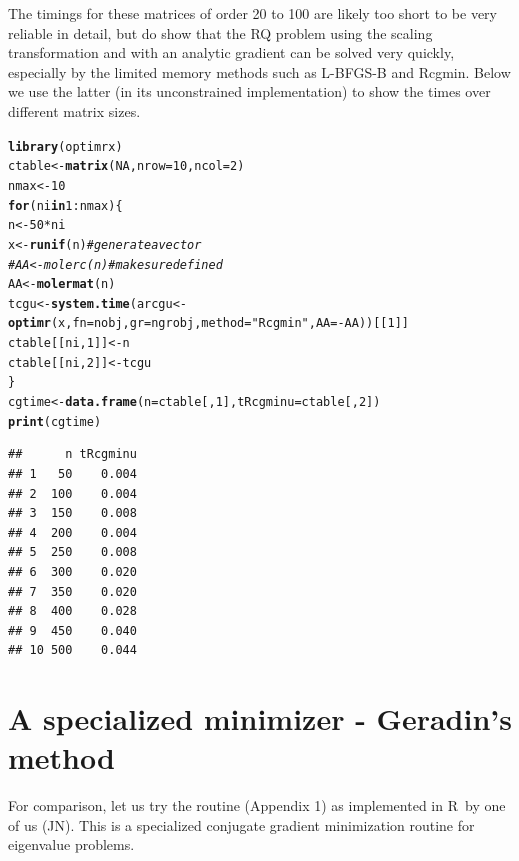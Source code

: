 \documentclass[10pt]{article}\usepackage[]{graphicx}\usepackage[]{color}
\makeatletter
\newcommand{\hlnum}[1]{\textcolor[rgb]{0.686,0.059,0.569}{#1}}%
\newcommand{\hlstr}[1]{\textcolor[rgb]{0.192,0.494,0.8}{#1}}%
\newcommand{\hlcom}[1]{\textcolor[rgb]{0.678,0.584,0.686}{\textit{#1}}}%
\newcommand{\hlopt}[1]{\textcolor[rgb]{0,0,0}{#1}}%
\newcommand{\hlstd}[1]{\textcolor[rgb]{0.345,0.345,0.345}{#1}}%
\newcommand{\hlkwa}[1]{\textcolor[rgb]{0.161,0.373,0.58}{\textbf{#1}}}%
\newcommand{\hlkwb}[1]{\textcolor[rgb]{0.69,0.353,0.396}{#1}}%
\newcommand{\hlkwc}[1]{\textcolor[rgb]{0.333,0.667,0.333}{#1}}%
\newcommand{\hlkwd}[1]{\textcolor[rgb]{0.737,0.353,0.396}{\textbf{#1}}}%
\newenvironment{kframe}{%
 \def\at@end@of@kframe{}%
 \ifinner\ifhmode%
  \def\at@end@of@kframe{\end{minipage}}%
  \begin{minipage}{\columnwidth}%
 \fi\fi%
 \def\FrameCommand##1{\hskip\@totalleftmargin \hskip-\fboxsep
 \colorbox{shadecolor}{##1}\hskip-\fboxsep
     \hskip-\linewidth \hskip-\@totalleftmargin \hskip\columnwidth}%
 \MakeFramed {\advance\hsize-\width
   \@totalleftmargin\z@ \linewidth\hsize
   \@setminipage}}%
 {\par\unskip\endMakeFramed%
 \at@end@of@kframe}
\newenvironment{knitrout}{}{} %
\newcommand{\R}{{\sf R\ }}
\makeatother
\begin{document}
The timings for these matrices of order 20 to 100 are likely too short to be very
reliable in detail, but do show that the RQ problem using the scaling transformation
and with an analytic gradient can be solved very quickly, especially by the limited
memory methods such as L-BFGS-B and Rcgmin. Below we use the latter (in its 
unconstrained implementation) to show the times over different matrix sizes.

\begin{knitrout}\scriptsize
{}\color{fgcolor}\begin{kframe}
\begin{alltt}
\hlkwd{library}\hlstd{(optimrx)}
\hlstd{ctable}\hlkwb{<-}\hlkwd{matrix}\hlstd{(}\hlnum{NA}\hlstd{,} \hlkwc{nrow}\hlstd{=}\hlnum{10}\hlstd{,} \hlkwc{ncol}\hlstd{=}\hlnum{2}\hlstd{)}
\hlstd{nmax}\hlkwb{<-}\hlnum{10}
\hlkwa{for} \hlstd{(ni} \hlkwa{in} \hlnum{1}\hlopt{:}\hlstd{nmax)\{}
  \hlstd{n}\hlkwb{<-}\hlnum{50}\hlopt{*}\hlstd{ni}
  \hlstd{x}\hlkwb{<-}\hlkwd{runif}\hlstd{(n)} \hlcom{# generate a vector }
\hlcom{#  AA<-molerc(n) # make sure defined}
  \hlstd{AA}\hlkwb{<-}\hlkwd{molermat}\hlstd{(n)}
  \hlstd{tcgu}\hlkwb{<-}\hlkwd{system.time}\hlstd{(arcgu}\hlkwb{<-}\hlkwd{optimr}\hlstd{(x,} \hlkwc{fn}\hlstd{=nobj,} \hlkwc{gr}\hlstd{=ngrobj,} \hlkwc{method}\hlstd{=}\hlstr{"Rcgmin"}\hlstd{,} \hlkwc{AA}\hlstd{=}\hlopt{-}\hlstd{AA))[[}\hlnum{1}\hlstd{]]}
  \hlstd{ctable[[ni,}\hlnum{1}\hlstd{]]} \hlkwb{<-} \hlstd{n}
  \hlstd{ctable[[ni,}\hlnum{2}\hlstd{]]} \hlkwb{<-} \hlstd{tcgu}
\hlstd{\}}
\hlstd{cgtime}\hlkwb{<-}\hlkwd{data.frame}\hlstd{(}\hlkwc{n}\hlstd{=ctable[,}\hlnum{1}\hlstd{],} \hlkwc{tRcgminu}\hlstd{=ctable[,}\hlnum{2}\hlstd{])}
\hlkwd{print}\hlstd{(cgtime)}
\end{alltt}
\begin{verbatim}
##      n tRcgminu
## 1   50    0.004
## 2  100    0.004
## 3  150    0.008
## 4  200    0.004
## 5  250    0.008
## 6  300    0.020
## 7  350    0.020
## 8  400    0.028
## 9  450    0.040
## 10 500    0.044
\end{verbatim}
\end{kframe}
\end{knitrout}

\section{A specialized minimizer - Geradin's method}

For comparison, let us try the \cite{Geradin71} routine (Appendix 1) as implemented in \R by one of 
us (JN). This is a specialized conjugate gradient minimization routine for eigenvalue problems.
\end{document}
